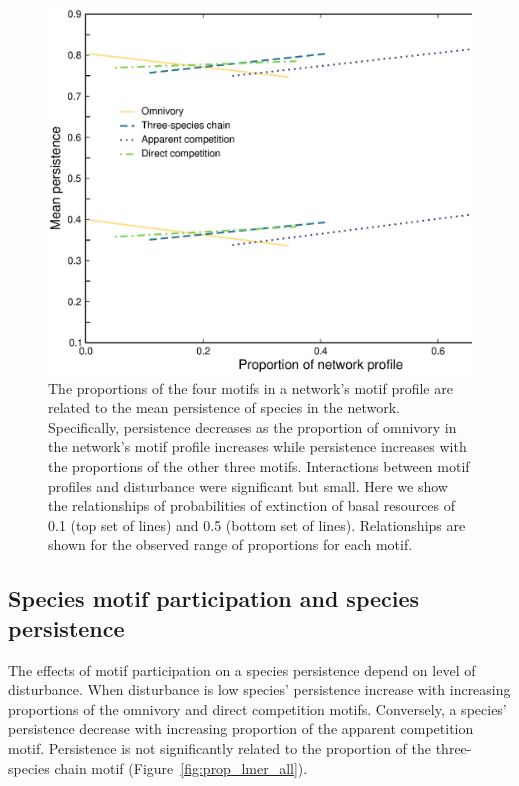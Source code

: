\documentclass[12pt]{article}
\begin{document}
\begin{spacing}{2.0}
        \begin{figure}
            \centering
            \includegraphics[height=.5\textheight]{figures/persistence_motif_profiles.eps}
            \caption{The proportions of the four motifs in a network's motif profile are related to the mean persistence of species in the network. Specifically, persistence decreases as the proportion of omnivory in the network's motif profile increases while persistence increases with the proportions of the other three motifs. Interactions between motif profiles and disturbance were significant but small. Here we show the relationships of probabilities of extinction of basal resources of 0.1 (top set of lines) and 0.5 (bottom set of lines). Relationships are shown for the observed range of proportions for each motif.}      
            \label{fig:motif_profile_persistence}
        \end{figure}    


    \subsection*{Species motif participation and species persistence} 
    
       The effects of motif participation on a species persistence depend on level of disturbance. When disturbance is low species' persistence increase with increasing proportions of the omnivory and direct competition motifs. Conversely, a species' persistence decrease with increasing proportion of the apparent competition motif. Persistence is not significantly related to the proportion of the three-species chain motif (Figure~\ref{fig:prop_lmer_all}).
            

\end{spacing}
\end{document}
